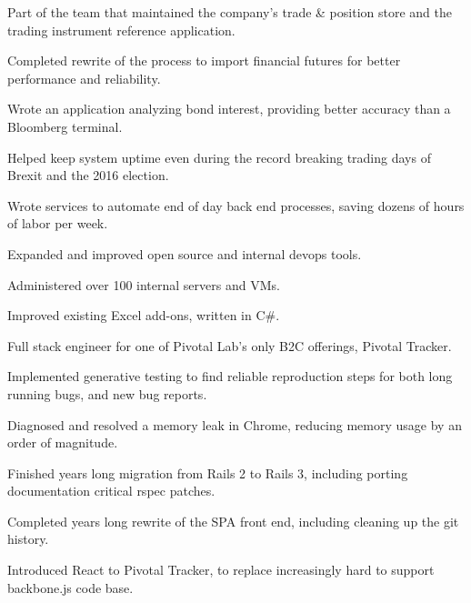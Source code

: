 \documentclass[]{deedy-resume-openfont}
\begin{document}
\vspace{\topsep}
\begin{tightemize}
\item Part of the team that maintained the company's trade \& position store and the trading instrument reference application.
\item Completed rewrite of the process to import financial futures for better performance and reliability.
\item Wrote an application analyzing bond interest, providing better accuracy than a Bloomberg terminal.
\item Helped keep system uptime even during the record breaking trading days of Brexit and the 2016 election.
\item Wrote services to automate end of day back end processes, saving dozens of hours of labor per week.
\item Expanded and improved open source and internal devops tools.
\item Administered over 100 internal servers and VMs.
\item Improved existing Excel add-ons, written in C\#.
\end{tightemize}
\sectionsep

\vspace{\topsep}
Full stack engineer for one of Pivotal Lab's only B2C offerings, Pivotal Tracker.
\vspace{\topsep}
\begin{tightemize}
\item Implemented generative testing to find reliable reproduction steps for both long running bugs, and new bug reports.
\item Diagnosed and resolved a memory leak in Chrome, reducing memory usage by an order of magnitude.
\item Finished years long migration from Rails 2 to Rails 3, including porting documentation critical rspec patches.
\item Completed years long rewrite of the SPA front end, including cleaning up the git history.
\item Introduced React to Pivotal Tracker, to replace increasingly hard to support backbone.js code base.
\end{tightemize}
\end{document}

